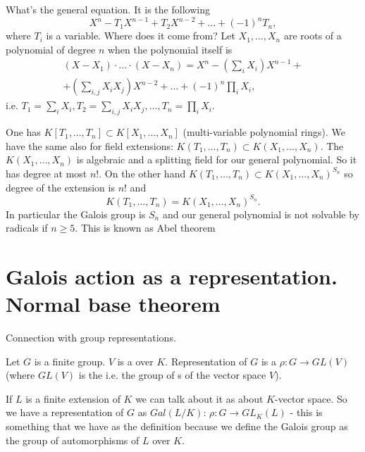 \begin{example}
  What's the general equation. It is the following
  \[
  X^n - T_1 X^{n-1} + T_2 X^{n-2} + \dots + \left(-1\right)^n T_n,
  \]
  where $T_i$ is a variable. Where does it come from? Let
  $X_1, \dots, X_n$ are roots of a polynomial of degree $n$ when the
  polynomial itself is
  \begin{eqnarray}
  \left(X - X_1\right) \cdot \dots \cdot \left(X - X_n\right) =
  X^n - \left(\sum_i X_i \right) X^{n-1} +
  \nonumber \\
  +
  \left(\sum_{i,j} X_i X_j \right) X^{n-2} + \dots +
  \left(-1\right)^n \prod_i X_i,
  \nonumber
  \end{eqnarray}
  i.e.
  $T_1 = \sum_i X_i, T_2 = \sum_{i,j} X_i X_j, \dots, T_n = \prod_i
  X_i$.

  One has $K\left[T_1, \dots, T_n\right] \subset K\left[X_1, \dots,
    X_n\right]$ (multi-variable polynomial rings). We have the same
  also for field extensions:
  $K\left(T_1, \dots, T_n\right) \subset K\left(X_1, \dots,
  X_n\right)$. The $K\left(X_1, \dots, X_n\right)$ is algebraic and a
  splitting field for our general polynomial. So it has degree at most
  $n!$. On the other hand
  $K\left(T_1, \dots, T_n\right) \subset K\left(X_1, \dots,
  X_n\right)^{S_n}$ so degree of the extension is $n!$ and
  \[
  K\left(T_1, \dots, T_n\right) = K\left(X_1, \dots,
  X_n\right)^{S_n}.
  \]
  In particular the Galois group is $S_n$ and our
  general polynomial is not solvable by radicals if $n \ge 5$.
  This is known as Abel theorem
  \label{ex:lec8_generalequation}
\end{example}

\section{Galois action as a representation. Normal base theorem}

Connection with group representations.
\begin{definition}
  Let $G$ is a finite group. $V$ is a  over
  $K$. Representation of $G$ is a 
  $\rho: G \to GL\left(V\right)$
  (where $GL\left(V\right)$ is the  i.e. the group of
  s of the vector space $V$).
  \label{def:grouprepresentation}
\end{definition}

If $L$ is a finite extension of $K$ we can talk about it as about
$K$-vector space. So we have a representation of $G$ as
 $Gal\left(L/K\right)$:
$\rho: G \to GL_K\left(L\right)$ - this is something that we have as
the definition because we define the Galois group as the group of
automorphisms of $L$ over $K$.

